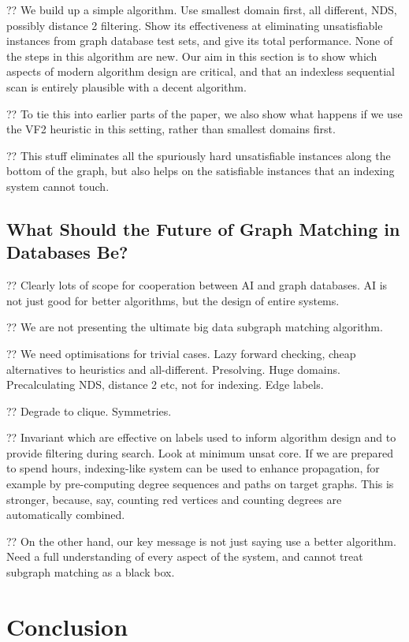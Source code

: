 \documentclass[twoside,11pt]{article}
\begin{document}
?? We build up a simple algorithm. Use smallest domain first, all different, NDS, possibly distance
2 filtering. Show its effectiveness at eliminating unsatisfiable instances from graph database test
sets, and give its total performance.  None of the steps in this algorithm are new. Our aim in this
section is to show which aspects of modern algorithm design are critical, and that an indexless
sequential scan is entirely plausible with a decent algorithm.

?? To tie this into earlier parts of the paper, we also show what happens if we use the VF2
heuristic in this setting, rather than smallest domains first.

?? This stuff eliminates all the spuriously hard unsatisfiable instances along the bottom of the
graph, but also helps on the satisfiable instances that an indexing system cannot touch.

\subsection{What Should the Future of Graph Matching in Databases Be?}

?? Clearly lots of scope for cooperation between AI and graph databases. AI is not just good for
better algorithms, but the design of entire systems.

?? We are not presenting the ultimate big data subgraph matching algorithm.

?? We need optimisations for trivial cases. Lazy forward checking, cheap alternatives to heuristics
and all-different. Presolving. Huge domains.  Precalculating NDS, distance 2 etc, not for indexing.
Edge labels.

?? Degrade to clique. Symmetries.

?? Invariant which are effective on labels used to inform algorithm design and to provide filtering
during search. Look at minimum unsat core. If we are prepared to spend hours, indexing-like system
can be used to enhance propagation, for example by pre-computing degree sequences and paths on
target graphs. This is stronger, because, say, counting red vertices and counting degrees are
automatically combined.

?? On the other hand, our key message is not just saying use a better algorithm. Need a full
understanding of every aspect of the system, and cannot treat subgraph matching as a black box.

\section{Conclusion}
\end{document}
